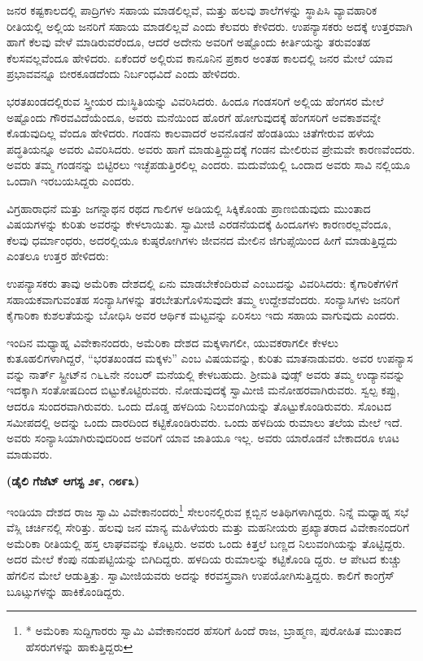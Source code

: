 ಜನರ ಕಷ್ಟಕಾಲದಲ್ಲಿ ಪಾದ್ರಿಗಳು ಸಹಾಯ ಮಾಡಲಿಲ್ಲವೆ, ಮತ್ತು ಹಲವು ಶಾಲೆಗಳನ್ನು ಸ್ಥಾಪಿಸಿ ವ್ಯಾವಹಾರಿಕ ರೀತಿಯಲ್ಲಿ ಅಲ್ಲಿಯ ಜನರಿಗೆ ಸಹಾಯ ಮಾಡಲಿಲ್ಲವೆ ಎಂದು ಕೆಲವರು ಕೇಳಿದರು. ಉಪನ್ಯಾಸಕರು ಅದಕ್ಕೆ ಉತ್ತರವಾಗಿ ಹಾಗೆ ಕೆಲವು ವೇಳೆ ಮಾಡಿರುವರೆಂದೂ, ಆದರೆ ಅದೇನು ಅವರಿಗೆ ಅಷ್ಟೊಂದು ಕೀರ್ತಿಯನ್ನು ತರುವಂತಹ ಕೆಲಸವಲ್ಲವೆಂದೂ ಹೇಳಿದರು. ಏಕೆಂದರೆ ಅಲ್ಲಿರುವ ಕಾನೂನಿನ ಪ್ರಕಾರ ಅಂತಹ ಕಾಲದಲ್ಲಿ ಜನರ ಮೇಲೆ ಯಾವ ಪ್ರಭಾವವನ್ನೂ ಬೀರಕೂಡದೆಂದು ನಿರ್ಬಂಧವಿದೆ ಎಂದು ಹೇಳಿದರು.

ಭರತಖಂಡದಲ್ಲಿರುವ ಸ್ತ್ರೀಯರ ದುಃಸ್ಥಿತಿಯನ್ನು ವಿವರಿಸಿದರು. ಹಿಂದೂ ಗಂಡಸರಿಗೆ ಅಲ್ಲಿಯ ಹೆಂಗಸರ ಮೇಲೆ ಅಷ್ಟೊಂದು ಗೌರವವಿದೆಯೆಂದೂ, ಅವರು ಮನೆಯಿಂದ ಹೊರಗೆ ಹೋಗುವುದಕ್ಕೆ ಹೆಂಗಸರಿಗೆ ಅವಕಾಶವನ್ನೇ ಕೊಡುವುದಿಲ್ಲ ವೆಂದೂ ಹೇಳಿದರು. ಗಂಡನು ಕಾಲವಾದರೆ ಅವನೊಡನೆ ಹೆಂಡತಿಯು ಚಿತೆಗೇರುವ ಹಳೆಯ ಪದ್ಧತಿಯನ್ನೂ ಅವರು ವಿವರಿಸಿದರು. ಅವರು ಹಾಗೆ ಮಾಡುತ್ತಿದ್ದುದಕ್ಕೆ ಗಂಡನ ಮೇಲಿರುವ ಪ್ರೇಮವೇ ಕಾರಣವೆಂದರು. ಅವರು ತಮ್ಮ ಗಂಡನನ್ನು ಬಿಟ್ಟಿರಲು ಇಚ್ಛೆಪಡುತ್ತಿರಲಿಲ್ಲ ಎಂದರು. ಮದುವೆಯಲ್ಲಿ ಒಂದಾದ ಅವರು ಸಾವಿ ನಲ್ಲಿಯೂ ಒಂದಾಗಿ ಇರಬಯಸಿದ್ದರು ಎಂದರು.

ವಿಗ್ರಹಾರಾಧನೆ ಮತ್ತು ಜಗನ್ನಾಥನ ರಥದ ಗಾಲಿಗಳ ಅಡಿಯಲ್ಲಿ ಸಿಕ್ಕಿಕೊಂಡು ಪ್ರಾಣಬಿಡುವುದು ಮುಂತಾದ ವಿಷಯಗಳನ್ನು ಕುರಿತು ಅವರನ್ನು ಕೇಳಲಾಯಿತು. ಸ್ವಾಮೀಜಿ ಎರಡನೆಯದಕ್ಕೆ ಹಿಂದೂಗಳು ಕಾರಣರಲ್ಲವೆಂದೂ, ಕೆಲವು ಧರ್ಮಾಂಧರು, ಅದರಲ್ಲಿಯೂ ಕುಷ್ಠರೋಗಿಗಳು ಜೀವನದ ಮೇಲಿನ ಜಿಗುಪ್ಸೆಯಿಂದ ಹೀಗೆ ಮಾಡುತ್ತಿದ್ದದು ಎಂತಲೂ ಉತ್ತರ ಹೇಳಿದರು:

ಉಪನ್ಯಾಸಕರು ತಾವು ಅಮೆರಿಕಾ ದೇಶದಲ್ಲಿ ಏನು ಮಾಡಬೇಕೆಂದಿರುವೆ ಎಂಬುದನ್ನು ವಿವರಿಸಿದರು: ಕೈಗಾರಿಕೆಗಳಿಗೆ ಸಹಾಯಕವಾಗುವಂತಹ ಸಂನ್ಯಾಸಿಗಳನ್ನು ತರಬೇತುಗೊಳಿಸುವುದೇ ತಮ್ಮ ಉದ್ದೇಶವೆಂದರು. ಸಂನ್ಯಾಸಿಗಳು ಜನರಿಗೆ ಕೈಗಾರಿಕಾ ಕುಶಲತೆಯನ್ನು ಬೋಧಿಸಿ ಅವರ ಆರ್ಥಿಕ ಮಟ್ಟವನ್ನು ಏರಿಸಲು ಇದು ಸಹಾಯ ವಾಗುವುದು ಎಂದರು.

ಇಂದಿನ ಮಧ್ಯಾಹ್ನ ವಿವೇಕಾನಂದರು, ಅಮೆರಿಕಾ ದೇಶದ ಮಕ್ಕಳಾಗಲೀ, ಯುವಕರಾಗಲೀ ಕೇಳಲು ಕುತೂಹಲಿಗಳಾಗಿದ್ದರೆ, “ಭರತಖಂಡದ ಮಕ್ಕಳು” ಎಂಬ ವಿಷಯವನ್ನು, ಕುರಿತು ಮಾತನಾಡುವರು. ಅವರ ಉಪನ್ಯಾಸ ವನ್ನು ನಾರ್ತ್​ ಸ್ಟ್ರೀಟ್​ನ ೧೬೬ನೇ ನಂಬರ್​ ಮನೆಯಲ್ಲಿ ಕೇಳಬಹುದು. ಶ‍್ರೀಮತಿ ವುಡ್ಸ್​ ಅವರು ತಮ್ಮ ಉದ್ಯಾನವನ್ನು ಇದಕ್ಕಾಗಿ ಸಂತೋಷದಿಂದ ಬಿಟ್ಟುಕೊಟ್ಟಿರುವರು. ನೋಡುವುದಕ್ಕೆ ಸ್ವಾಮೀಜಿ ಮನೋಹರವಾಗಿರುವರು. ಸ್ವಲ್ಪ ಕಪ್ಪು, ಆದರೂ ಸುಂದರವಾಗಿರುವರು. ಒಂದು ದೊಡ್ಡ ಹಳದಿಯ ನಿಲುವಂಗಿಯನ್ನು ತೊಟ್ಟುಕೊಂಡಿರುವರು. ಸೊಂಟದ ಸಮೀಪದಲ್ಲಿ ಅದನ್ನು ಒಂದು ದಾರದಿಂದ ಕಟ್ಟಿಕೊಂಡಿರುವರು. ಒಂದು ಹಳದಿಯ ರುಮಾಲು ತಲೆಯ ಮೇಲೆ ಇದೆ. ಅವರು ಸಂನ್ಯಾಸಿಯಾಗಿರುವುದರಿಂದ ಅವರಿಗೆ ಯಾವ ಜಾತಿಯೂ ಇಲ್ಲ. ಅವರು ಯಾರೊಡನೆ ಬೇಕಾದರೂ ಊಟ ಮಾಡುವರು.

\begin{center}
\textbf{(ಡೈಲಿ ಗೆಜೆಟ್​ ಆಗಸ್ಟ ೨೯, ೧೮೯೩)}
\end{center}

ಇಂಡಿಯಾ ದೇಶದ ರಾಜ ಸ್ವಾಮಿ ವಿವೇಕಾನಂದರು\footnote{* ಅಮೆರಿಕಾ ಸುದ್ದಿಗಾರರು ಸ್ವಾಮಿ ವಿವೇಕಾನಂದರ ಹೆಸರಿಗೆ ಹಿಂದೆ ರಾಜ, ಬ್ರಾಹ್ಮಣ, ಪುರೋಹಿತ ಮುಂತಾದ ಹೆಸರುಗಳನ್ನು ಹಾಕುತ್ತಿದ್ದರು} ಸೇಲಂನಲ್ಲಿರುವ  ಕ್ಲಬ್ಬಿನ ಅತಿಥಿಗಳಾಗಿದ್ದರು. ನಿನ್ನೆ ಮಧ್ಯಾಹ್ನ ಸಭೆ ವೆಸ್ಲಿ ಚರ್ಚಿನಲ್ಲಿ ಸೇರಿತ್ತು. ಹಲವು ಜನ ಮಾನ್ಯ ಮಹಿಳೆಯರು ಮತ್ತು ಮಹನೀಯರು ಪ್ರಖ್ಯಾತರಾದ ವಿವೇಕಾನಂದರಿಗೆ ಅಮೆರಿಕಾ ರೀತಿಯಲ್ಲಿ ಹಸ್ತ ಲಾಘವವನ್ನು ಕೊಟ್ಟರು. ಅವರು ಒಂದು ಕಿತ್ತಲೆ ಬಣ್ಣದ ನಿಲುವಂಗಿಯನ್ನು ತೊಟ್ಟಿದ್ದರು. ಅದರ ಮೇಲೆ ಕೆಂಪು ನಡುಪಟ್ಟಿಯನ್ನು ಬಿಗಿದಿದ್ದರು. ಹಳದಿಯ ರುಮಾಲನ್ನು ಕಟ್ಟಿಕೊಂಡಿ ದ್ದರು. ಆ ಪೇಟದ ಕುಚ್ಚು ಹೆಗಲಿನ ಮೇಲೆ ಆಡುತ್ತಿತ್ತು. ಸ್ವಾಮೀಜಿಯವರು ಅದನ್ನು ಕರವಸ್ತ್ರವಾಗಿ ಉಪಯೋಗಿಸುತ್ತಿದ್ದರು. ಕಾಲಿಗೆ ಕಾಂಗ್ರೆಸ್​ ಬೂಟ್ಸುಗಳನ್ನು ಹಾಕಿಕೊಂಡಿದ್ದರು.

